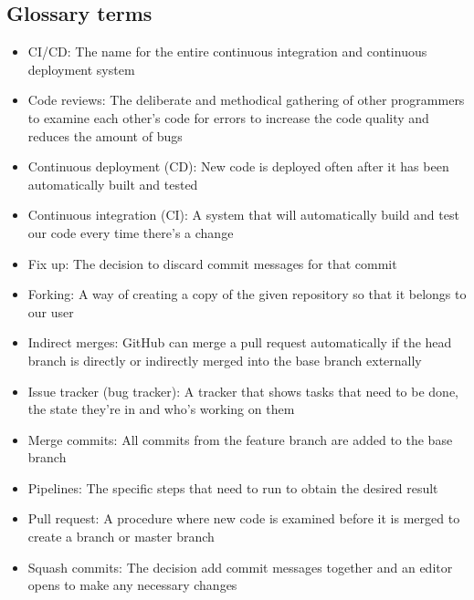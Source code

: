 \documentclass{article}
\begin{document}
\subsection{Glossary terms}
\begin{itemize}

    \item CI/CD: The name for the entire continuous integration and continuous deployment system

    \item Code reviews: The deliberate and methodical gathering of other programmers to examine each other's code for errors to increase the code quality and reduces the amount of bugs

    \item Continuous deployment (CD): New code is deployed often after it has been automatically built and tested

    \item Continuous integration (CI): A system that will automatically build and test our code every time there's a change

    \item Fix up: The decision to discard commit messages for that commit 

    \item Forking: A way of creating a copy of the given repository so that it belongs to our user

    \item Indirect merges: GitHub can merge a pull request automatically if the head branch is directly or indirectly merged into the base branch externally

    \item Issue tracker (bug tracker): A tracker that shows tasks that need to be done, the state they're in and who's working on them

    \item Merge commits: All commits from the feature branch are added to the base branch

    \item Pipelines: The specific steps that need to run to obtain the desired result

    \item Pull request: A procedure where new code is examined before it is merged to create a branch or master branch 

    \item Squash commits: The decision add commit messages together and an editor opens to make any necessary changes
\end{itemize}
\end{document}
